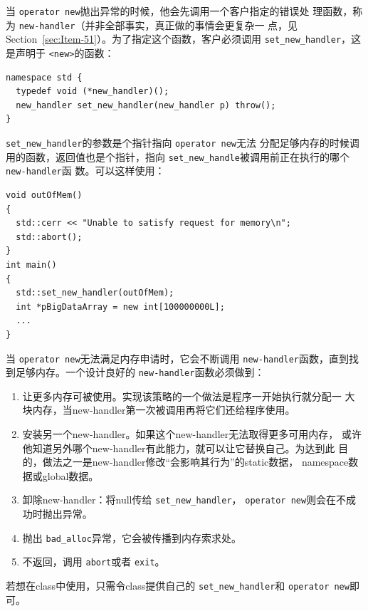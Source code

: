 \documentclass[a4paper,twoside]{article}
\theoremstyle{definition}
\theoremstyle{remark}
\numberwithin{equation}{section}
\let\OldTexttt\texttt
\renewcommand{\texttt}[1]{{\color{blue} \OldTexttt{#1}}}
\begin{document}
当\texttt{operator new}抛出异常的时候，他会先调用一个客户指定的错误处
理函数，称为\texttt{new-handler}（并非全部事实，真正做的事情会更复杂一
点，见Section~\ref{sec:Item-51}）。为了指定这个函数，客户必须调用
\texttt{set\_new\_handler}，这是声明于\texttt{<new>}的函数：
\begin{verbatim}
namespace std {
  typedef void (*new_handler)();
  new_handler set_new_handler(new_handler p) throw();
}
\end{verbatim}

\texttt{set\_new\_handler}的参数是个指针指向\texttt{operator new}无法
分配足够内存的时候调用的函数，返回值也是个指针，指向
\texttt{set\_new\_handle}被调用前正在执行的哪个\texttt{new-handler}函
数。可以这样使用：

\begin{verbatim}
void outOfMem()
{
  std::cerr << "Unable to satisfy request for memory\n";
  std::abort();
}
int main()
{
  std::set_new_handler(outOfMem);
  int *pBigDataArray = new int[100000000L];
  ...
}
\end{verbatim}

当\texttt{operator new}无法满足内存申请时，它会不断调用
\texttt{new-handler}函数，直到找到足够内存。一个设计良好的
\texttt{new-handler}函数必须做到：
\begin{enumerate}
\item 让更多内存可被使用。实现该策略的一个做法是程序一开始执行就分配一
  大块内存，当new-handler第一次被调用再将它们还给程序使用。
\item 安装另一个new-handler。如果这个new-handler无法取得更多可用内存，
  或许他知道另外哪个new-handler有此能力，就可以让它替换自己。为达到此
  目的，做法之一是new-handler修改“会影响其行为”的static数据，
  namespace数据或global数据。
\item 卸除new-handler：将null传给\texttt{set\_new\_handler}，
  \texttt{operator new}则会在不成功时抛出异常。
\item 抛出\texttt{bad\_alloc}异常，它会被传播到内存索求处。
\item 不返回，调用\texttt{abort}或者\texttt{exit}。
\end{enumerate}

若想在class中使用，只需令class提供自己的\texttt{set\_new\_handler}和
\texttt{operator new}即可。
\end{document}
